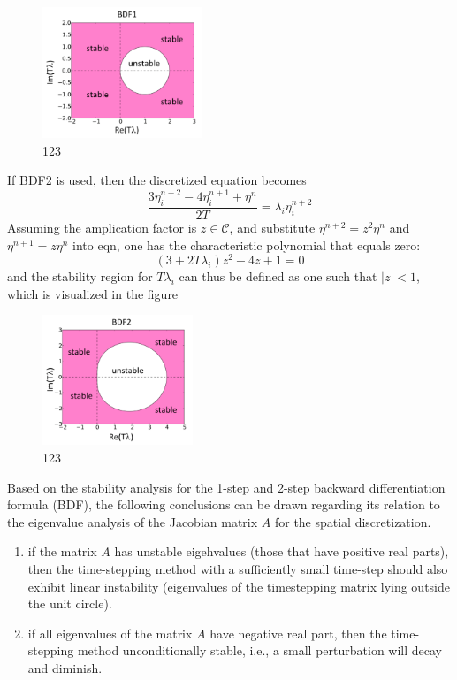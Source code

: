 \documentclass[journal,final]{new-aiaa}
\begin{document}
\begin{figure}[htb]
	\centering   
	\includegraphics[width=0.428\textwidth]{PyPlot/eigen-vs-timedomain/bdf1.png}	
	\caption{123}
\end{figure}

If BDF2 is used, then
the discretized equation becomes
\begin{equation}\label{discretetime}
\dfrac{3\eta^{n+2}_i-4\eta^{n+1}_i +\eta^n}{2T} = \lambda_i  \eta_i^{n+2}
\end{equation}
Assuming the amplication factor is $z\in \mathcal C$, and substitute
$\eta^{n+2}=z^2 \eta^n$ and  $\eta^{n+1}=z \eta^n$ into eqn, one has
the characteristic polynomial that equals zero:
\begin{equation*}
(3+2T\lambda_i) z^2 -4z+1=0
\end{equation*}
and the stability region for $T\lambda_i$ can thus be defined as one such
that $|z|<1$, which is visualized in the figure
\begin{figure}[htb]
	\centering   
	\includegraphics[width=0.4\textwidth]{PyPlot/eigen-vs-timedomain/bdf2.png}	
	\caption{123}
\end{figure}

Based on the stability analysis for the 1-step and 2-step backward differentiation formula (BDF),
the following conclusions can be drawn regarding its relation to the eigenvalue analysis of the
Jacobian matrix $A$ for the spatial discretization.
\begin{enumerate}
	\item if the matrix $A$ has unstable eigehvalues (those that have positive
	real parts), then the time-stepping method with a sufficiently small time-step 
	should also exhibit linear instability (eigenvalues of the timestepping matrix
	lying outside the unit circle).
	\item if all eigenvalues of the matrix $A$ have negative real part, then the
	time-stepping method unconditionally stable, i.e., a small perturbation
	will decay and diminish.
\end{enumerate}
\end{document}
